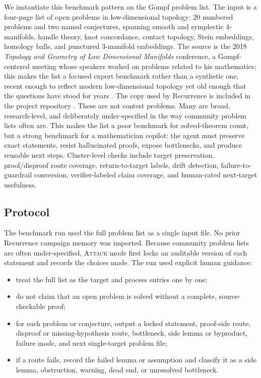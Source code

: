 \documentclass{article}
\theoremstyle{definition}
\theoremstyle{remark}
\begin{document}
We instantiate this benchmark pattern on the Gompf problem list. The input is a four-page list of open problems in low-dimensional topology: 20 numbered problems and two named conjectures, spanning smooth and symplectic 4-manifolds, handle theory, knot concordance, contact topology, Stein embeddings, homology balls, and punctured 3-manifold embeddings. The source is the 2018 \emph{Topology and Geometry of Low Dimensional Manifolds} conference, a Gompf-centered meeting whose speakers worked on problems related to his mathematics; this makes the list a focused expert benchmark rather than a synthetic one, recent enough to reflect modern low-dimensional topology yet old enough that the questions have stood for years \citep{gatech2018lowdim}. The copy used by Recurrence is included in the project repository \citep{gompf2018problemlist}. These are not contest problems. Many are broad, research-level, and deliberately under-specified in the way community problem lists often are. This makes the list a poor benchmark for solved-theorem count, but a strong benchmark for a mathematician copilot: the agent must preserve exact statements, resist hallucinated proofs, expose bottlenecks, and produce reusable next steps. Cluster-level checks include target preservation, proof/disproof route coverage, return-to-target labels, drift detection, failure-to-guardrail conversion, verifier-labeled claim coverage, and human-rated next-target usefulness.

\subsection{Protocol}

The benchmark run used the full problem list as a single input file. No prior Recurrence campaign memory was imported. Because community problem lists are often under-specified, \textsc{Attack} mode first locks an auditable version of each statement and records the choices made. The run used explicit human guidance:
\begin{itemize}
  \item treat the full list as the target and process entries one by one;
  \item do not claim that an open problem is solved without a complete, source-checkable proof;
  \item for each problem or conjecture, output a locked statement, proof-side route, disproof or missing-hypothesis route, bottleneck, side lemma or byproduct, failure mode, and next single-target problem file;
  \item if a route fails, record the failed lemma or assumption and classify it as a side lemma, obstruction, warning, dead end, or unresolved bottleneck.
\end{itemize}
\end{document}
